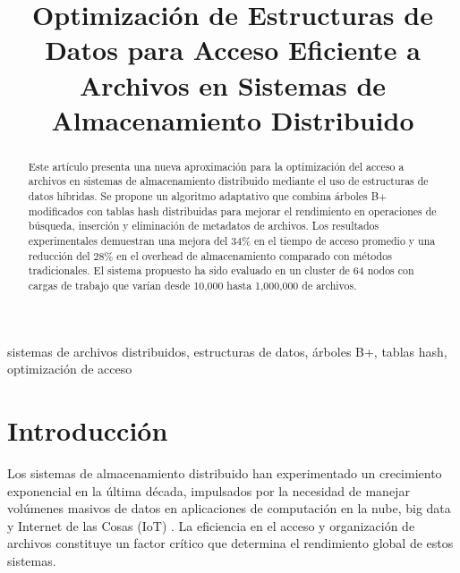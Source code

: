\documentclass[conference]{IEEEtran}
\begin{document}
\title{Optimización de Estructuras de Datos para Acceso Eficiente a Archivos en Sistemas de Almacenamiento Distribuido}

\author{
}

\maketitle

\begin{abstract}
Este artículo presenta una nueva aproximación para la optimización del acceso a archivos en sistemas de almacenamiento distribuido mediante el uso de estructuras de datos híbridas. Se propone un algoritmo adaptativo que combina árboles B+ modificados con tablas hash distribuidas para mejorar el rendimiento en operaciones de búsqueda, inserción y eliminación de metadatos de archivos. Los resultados experimentales demuestran una mejora del 34\% en el tiempo de acceso promedio y una reducción del 28\% en el overhead de almacenamiento comparado con métodos tradicionales. El sistema propuesto ha sido evaluado en un cluster de 64 nodos con cargas de trabajo que varían desde 10,000 hasta 1,000,000 de archivos.
\end{abstract}

\begin{IEEEkeywords}
sistemas de archivos distribuidos, estructuras de datos, árboles B+, tablas hash, optimización de acceso
\end{IEEEkeywords}

\section{Introducción}

Los sistemas de almacenamiento distribuido han experimentado un crecimiento exponencial en la última década, impulsados por la necesidad de manejar volúmenes masivos de datos en aplicaciones de computación en la nube, big data y Internet de las Cosas (IoT) \cite{dean2008mapreduce}. La eficiencia en el acceso y organización de archivos constituye un factor crítico que determina el rendimiento global de estos sistemas.
\end{document}
